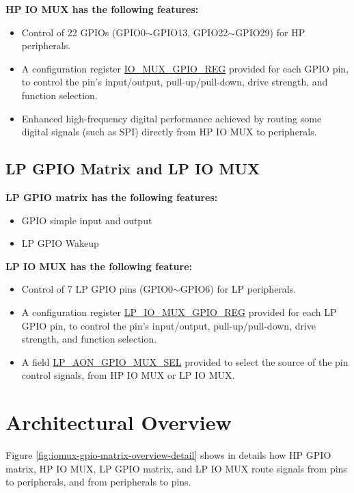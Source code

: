 \documentclass[main\_\_EN.tex]{subfiles}
\begin{document}
\textbf{HP IO MUX has the following features:}

\begin{itemize}
\item Control of 22 GPIOs (GPIO0$\sim$GPIO13, GPIO22$\sim$GPIO29) for HP peripherals.
\item A configuration register \hyperref[regdesc:IOMUXGPIONREG]{IO\_MUX\_GPIO\_REG} provided for each GPIO pin, to control the pin's input/output, pull-up/pull-down, drive strength, and function selection.
\item Enhanced high-frequency digital performance achieved by routing some digital signals (such as SPI) directly from HP IO MUX to peripherals.

\end{itemize}
\subsection{LP GPIO Matrix and LP IO MUX}
\textbf{LP GPIO matrix has the following features:}

\begin{itemize}
\item GPIO simple input and output
\item LP GPIO Wakeup
\end{itemize}

\textbf{LP IO MUX has the following feature:}

\begin{itemize}
    \item Control of 7 LP GPIO pins (GPIO0$\sim$GPIO6) for LP peripherals.
    \item A configuration register \hyperref[regdesc:LPIOMUXGPIONREG]{LP\_IO\_MUX\_GPIO\_REG} provided for each LP GPIO pin, to control the pin's input/output, pull-up/pull-down, drive strength, and function selection.
    \item A field \hyperref[fielddesc:LPAONGPIOMUXSEL] {LP\_AON\_GPIO\_MUX\_SEL} provided to select the source of the pin control signals, from HP IO MUX or LP IO MUX.
\end{itemize}

\section{Architectural Overview}
Figure \ref{fig:iomux-gpio-matrix-overview-detail} shows in details how HP GPIO matrix, HP IO MUX, LP GPIO matrix, and LP IO MUX route signals from pins to peripherals, and from peripherals to pins.
\end{document}
